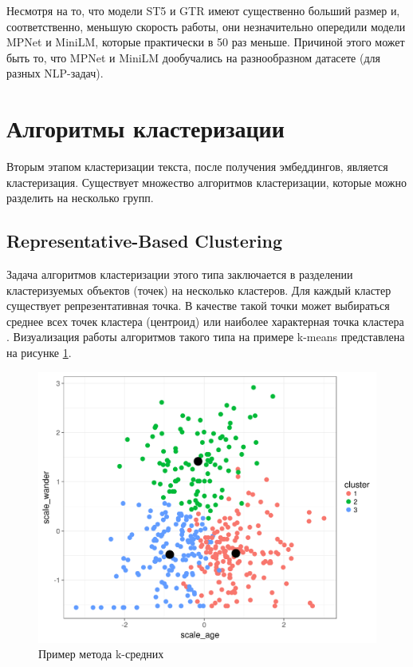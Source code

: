 Несмотря на то, что модели ST5 и GTR имеют существенно больший размер и, соответственно, меньшую скорость работы, они незначительно опередили модели MPNet и MiniLM, которые практически в 50 раз меньше. Причиной этого может быть то, что MPNet и MiniLM дообучались на разнообразном датасете (для разных NLP-задач).


\section{Алгоритмы кластеризации}

Вторым этапом кластеризации текста, после получения эмбеддингов, является кластеризация. Существует множество алгоритмов кластеризации, которые можно разделить на несколько групп.

\subsection{Representative-Based Clustering}

Задача алгоритмов кластеризации этого типа заключается в разделении кластеризуемых объектов (точек) на несколько кластеров. Для каждый кластер существует репрезентативная точка. В качестве такой точки может выбираться среднее всех точек кластера (центроид) или наиболее характерная точка кластера \cite{no-patterns, deep-clustering-survey}. Визуализация работы алгоритмов такого типа на примере k-means представлена на рисунке \ref{img:k-means-example}.

\begin{figure}[h]
    \centering
    \includegraphics[width=\linewidth * \real{0.75}]{images/k-means-example.png}
    \caption{Пример метода k-средних}
    \label{img:k-means-example}
\end{figure}

